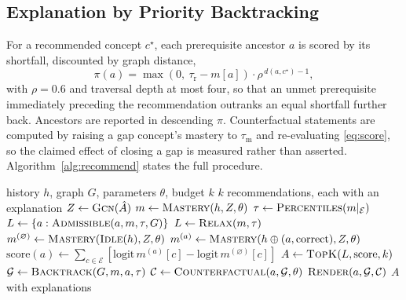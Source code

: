 \documentclass[conference]{IEEEtran}
\begin{document}
\subsection{Explanation by Priority Backtracking}

For a recommended concept $c^\star$, each prerequisite ancestor $a$ is scored by its
shortfall, discounted by graph distance,
%
\begin{equation}
\pi(a) = \max(0,\ \tau_{\mathrm{r}} - m[a]) \cdot \rho^{\,d(a,c^\star) - 1},
\label{eq:priority}
\end{equation}
%
with $\rho = 0.6$ and traversal depth at most four, so that an unmet prerequisite
immediately preceding the recommendation outranks an equal shortfall further back.
Ancestors are reported in descending $\pi$. Counterfactual statements are computed by
raising a gap concept's mastery to $\tau_{\mathrm{m}}$ and re-evaluating
\eqref{eq:score}, so the claimed effect of closing a gap is measured rather than
asserted. Algorithm~\ref{alg:recommend} states the full procedure.

\begin{algorithm}[t]
\caption{Explained recommendation}
\label{alg:recommend}
\begin{algorithmic}[1]
\Require history $h$, graph $G$, parameters $\theta$, budget $k$
\Ensure $k$ recommendations, each with an explanation
\State $Z \gets \textsc{Gcn}(\hat{A})$ 
\State $m \gets \textsc{Mastery}(h, Z, \theta)$ 
\State $\tau \gets \textsc{Percentiles}(m|_{\mathcal{E}})$
\State $L \gets \{a : \textsc{Admissible}(a, m, \tau, G)\}$ 
 \State $L \gets \textsc{Relax}(m, \tau)$ \EndIf
\State $m^{(\varnothing)} \gets \textsc{Mastery}(\textsc{Idle}(h), Z, \theta)$
 
  \State $m^{(a)} \gets \textsc{Mastery}(h \oplus (a, \mathrm{correct}), Z, \theta)$
  \State $\mathrm{score}(a) \gets \sum_{c \in \mathcal{E}}\!\left[\mathrm{logit}\,m^{(a)}[c] - \mathrm{logit}\,m^{(\varnothing)}[c]\right]$
\EndFor
\State $A \gets \textsc{TopK}(L, \mathrm{score}, k)$
  \State $\mathcal{G} \gets \textsc{Backtrack}(G, m, a, \tau)$ 
  \State $\mathcal{C} \gets \textsc{Counterfactual}(a, \mathcal{G}, \theta)$
  \State $\textsc{Render}(a, \mathcal{G}, \mathcal{C})$
\EndFor
\State \Return $A$ with explanations
\end{algorithmic}
\end{algorithm}
\end{document}
